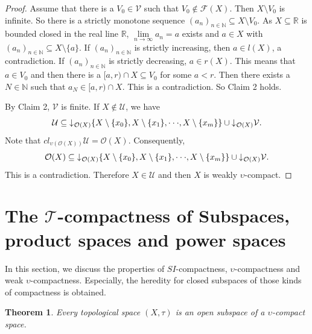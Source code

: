 \documentclass[preprint,12pt]{elsarticle}
\numberwithin{equation}{section}
\newtheorem{theorem}{Theorem}[section]
\newcommand{\dn}{\mathord{\downarrow}\hspace{0.05em}}
\begin{document}
\begin{proof}
Assume that there is a $V_{0}\in\mathcal{V}$ such that $V_{0}\not\in\mathscr{F}(X)$. Then $X\setminus V_{0}$ is infinite. So there is a strictly monotone sequence $(a_{n})_{n\in\mathbb{N}}\subseteq X\setminus V_{0}$. As $X\subseteq\mathbb{\mathbb{R}}$ is bounded closed in the real line $\mathbb{R}$, $\lim\limits_{n\longrightarrow\infty}a_{n}=a$ exists and $a\in X$ with $(a_{n})_{n\in\mathbb{N}}\subseteq X\setminus\{a\}$. If $(a_{n})_{n\in\mathbb{N}}$ is strictly increasing, then $a\in l(X)$, a contradiction. If $(a_{n})_{n\in\mathbb{N}}$ is strictly decreasing, $a\in r(X)$. This means that $a\in V_{0}$ and then there is a $[a,r)\cap X\subseteq V_{0}$ for some $a<r$. Then there exists a $N\in\mathbb{N}$ such that $a_{N}\in[a,r)\cap X$. This is a contradiction. So Claim 2 holds.

By Claim 2, $\mathcal{V}$ is finite. If $X\not\in\mathcal{U}$, we have
$$\mathcal{U}\subseteq\dn_{\mathcal{O}(X)}\{X\setminus\{x_{0}\},X\setminus\{x_{1}\},\cdot\cdot\cdot,X\setminus\{x_{m}\}\}\cup\dn_{\mathcal{O}(X)} \mathcal{V}.$$ Note that $cl_{\upsilon(\mathcal{O}(X))}\mathcal{U}=\mathcal{O}(X)$. Consequently,$$\mathcal{O}(X)\subseteq\dn_{\mathcal{O}(X)}\{X\setminus\{x_{0}\},X\setminus\{x_{1}\},\cdot\cdot\cdot,X\setminus\{x_{m}\}\}\cup\dn_{\mathcal{O}(X)} \mathcal{V}.$$ This is a contradiction. Therefore $X\in\mathcal{U}$ and then $X$ is weakly $\upsilon$-compact.\end{proof}


\section{The $\mathcal{T}$-compactness of Subspaces, product spaces and power spaces}

\quad In this section, we discuss the properties of $SI$-compactness, $\upsilon$-compactness and weak $\upsilon$-compactness. Especially, the heredity for closed subspaces of those kinds of compactness is obtained.

\begin{theorem} Every topological space $(X,\tau)$ is an open subspace of a $\upsilon$-compact space.
\end{theorem}
\end{document}
